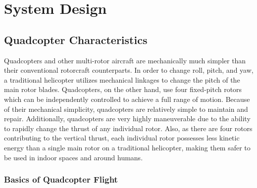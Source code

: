 
\chapter{System Design\label{ch:system}}

\section{Quadcopter Characteristics}

    Quadcopters and other multi-rotor aircraft are mechanically much simpler than their conventional rotorcraft counterparts. In order to change roll, pitch, and yaw, a traditional helicopter utilizes mechanical linkages to change the pitch of the main rotor blades. Quadcopters, on the other hand, use four fixed-pitch rotors which can be independently controlled to achieve a full range of motion. Because of their mechanical simplicity, quadcopters are relatively simple to maintain and repair. Additionally, quadcopters are very highly maneuverable due to the ability to rapidly change the thrust of any individual rotor. Also, as there are four rotors contributing to the vertical thrust, each individual rotor possesses less kinetic energy than a single main rotor on a traditional helicopter, making them safer to be used in indoor spaces and around humans. 

    \subsection{Basics of Quadcopter Flight}

